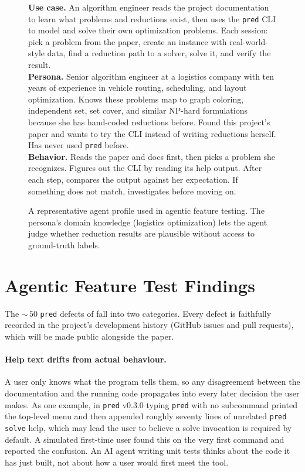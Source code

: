 \documentclass{article}
\begin{document}
\begin{figure}[h]
  \centering
  \begin{tcolorbox}[
    colback=gray!5, colframe=gray!80,
    title={\textbf{Agent Profile:} Dr.\ Sarah Chen --- CLI Tool (\texttt{pred})},
    fonttitle=\small, boxrule=0.4pt, arc=2pt, left=4pt, right=4pt, top=2pt, bottom=2pt
  ]
  \small
  \textbf{Use case.}
  An algorithm engineer reads the project documentation to learn what problems and reductions exist, then uses the \texttt{pred} CLI to model and solve their own optimization problems.
  Each session: pick a problem from the paper, create an instance with real-world-style data, find a reduction path to a solver, solve it, and verify the result.\\[4pt]
  \textbf{Persona.}
  Senior algorithm engineer at a logistics company with ten years of experience in vehicle routing, scheduling, and layout optimization.
  Knows these problems map to graph coloring, independent set, set cover, and similar NP-hard formulations because she has hand-coded reductions before.
  Found this project's paper and wants to try the CLI instead of writing reductions herself.
  Has never used \texttt{pred} before.\\[4pt]
  \textbf{Behavior.}
  Reads the paper and docs first, then picks a problem she recognizes.
  Figures out the CLI by reading its help output.
  After each step, compares the output against her expectation.
  If something does not match, investigates before moving on.
  \end{tcolorbox}
  \caption{A representative agent profile used in agentic feature testing.
    The persona's domain knowledge (logistics optimization) lets the agent judge whether reduction results are plausible without access to ground-truth labels.}
  \label{fig:agent-profile}
\end{figure}

\section{Agentic Feature Test Findings}\label{app:agentic-tests}

The ${\sim}\,50$ \texttt{pred} defects of  fall into two categories. Every defect is faithfully recorded in the project's development history (GitHub issues and pull requests), which will be made public alongside the paper.

\paragraph{Help text drifts from actual behaviour.}
A user only knows what the program tells them, so any disagreement between the documentation and the running code propagates into every later decision the user makes. As one example, in \texttt{pred} v0.3.0 typing \texttt{pred} with no subcommand printed the top-level menu and then appended roughly seventy lines of unrelated \texttt{pred solve} help, which may lead the user to believe a solve invocation is required by default. A simulated first-time user found this on the very first command and reported the confusion. An AI agent writing unit tests thinks about the code it has just built, not about how a user would first meet the tool.
\end{document}
